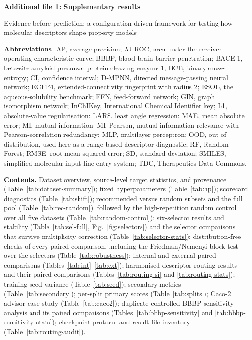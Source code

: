 \documentclass[10pt,a4paper]{article}
\begin{document}
{\large\bfseries Additional file 1: Supplementary results}\par
\smallskip
Evidence before prediction: a configuration-driven framework for testing how molecular descriptors shape property models\par
\medskip

\textbf{Abbreviations.} AP, average precision; AUROC, area under the receiver operating characteristic curve; BBBP, blood-brain barrier penetration; BACE-1, beta-site amyloid precursor protein cleaving enzyme 1; BCE, binary cross-entropy; CI, confidence interval; D-MPNN, directed message-passing neural network; ECFP4, extended-connectivity fingerprint with radius 2; ESOL, the aqueous-solubility benchmark; FFN, feed-forward network; GIN, graph isomorphism network; InChIKey, International Chemical Identifier key; L1, absolute-value regularisation; LARS, least angle regression; MAE, mean absolute error; MI, mutual information; MI--Pearson, mutual-information relevance with Pearson-correlation redundancy; MLP, multilayer perceptron; OOD, out of distribution, used here as a range-based descriptor diagnostic; RF, Random Forest; RMSE, root mean squared error; SD, standard deviation; SMILES, simplified molecular input line entry system; TDC, Therapeutics Data Commons.

\textbf{Contents.} Dataset overview, source-level target statistics, and provenance (Table~\ref{tab:dataset-summary}); fixed hyperparameters (Table~\ref{tab:hp}); scorecard diagnostics (Table~\ref{tab:shift}); recommended versus random subsets and the full pool (Table~\ref{tab:rec-random}), followed by the high-repetition random control over all five datasets (Table~\ref{tab:random-control}); six-selector results and stability (Table~\ref{tab:sel-full}, Fig.~\ref{fig:selectors}) and the selector comparisons that survive multiplicity correction (Table~\ref{tab:selector-stats}); distribution-free checks of every paired comparison, including the Friedman/Nemenyi block test over the selectors (Table~\ref{tab:robustness}); internal and external paired comparisons (Tables~\ref{tab:int}--\ref{tab:ext}); harmonised descriptor-routing results and their paired comparisons (Tables~\ref{tab:routing-si} and \ref{tab:routing-stats}); training-seed variance (Table~\ref{tab:seed}); secondary metrics (Table~\ref{tab:secondary}); per-split primary scores (Table~\ref{tab:splits}); Caco-2 advisor case study (Table~\ref{tab:caco2}); duplicate-controlled BBBP sensitivity analysis and its paired comparisons (Tables~\ref{tab:bbbp-sensitivity} and \ref{tab:bbbp-sensitivity-stats}); checkpoint protocol and result-file inventory (Table~\ref{tab:routing-audit}).
\end{document}

